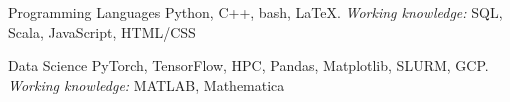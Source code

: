 \vspace{-4mm}
\begin{cvskills}

\cvskill
   {Programming Languages}
    {Python, C++, bash, \textrm{\LaTeX}. \textit{Working knowledge:} SQL, Scala, JavaScript, HTML/CSS}

  \cvskill
   {Data Science}
   {PyTorch, TensorFlow, HPC, Pandas, Matplotlib, SLURM, GCP. \textit{Working knowledge:} MATLAB, Mathematica}

 \vspace{-5mm}
\end{cvskills}
